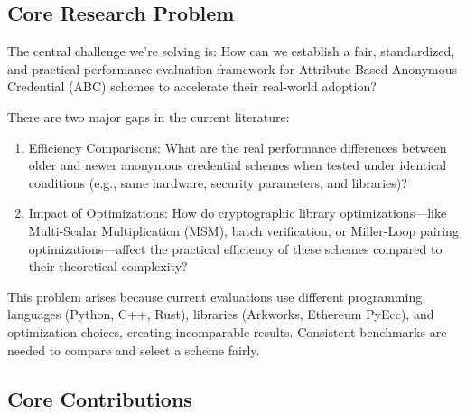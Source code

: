 


\subsection{Core Research Problem}
The central challenge we’re solving is: How can we establish a fair, standardized, and practical performance evaluation framework for Attribute-Based Anonymous Credential (ABC) schemes to accelerate their real-world adoption? 

There are two major gaps in the current literature:
\begin{enumerate}
    \item Efficiency Comparisons: What are the real performance differences between older and newer anonymous credential schemes when tested under identical conditions (e.g., same hardware, security parameters, and libraries)?

    \item Impact of Optimizations: How do cryptographic library optimizations—like Multi-Scalar Multiplication (MSM), batch verification, or Miller-Loop pairing optimizations—affect the practical efficiency of these schemes compared to their theoretical complexity?
    
\end{enumerate}
This problem arises because current evaluations use different programming languages (Python, C++, Rust), libraries (Arkworks, Ethereum PyEcc), and optimization choices, creating incomparable results. Consistent benchmarks are needed to compare and select a scheme fairly. 



\subsection{Core Contributions}

